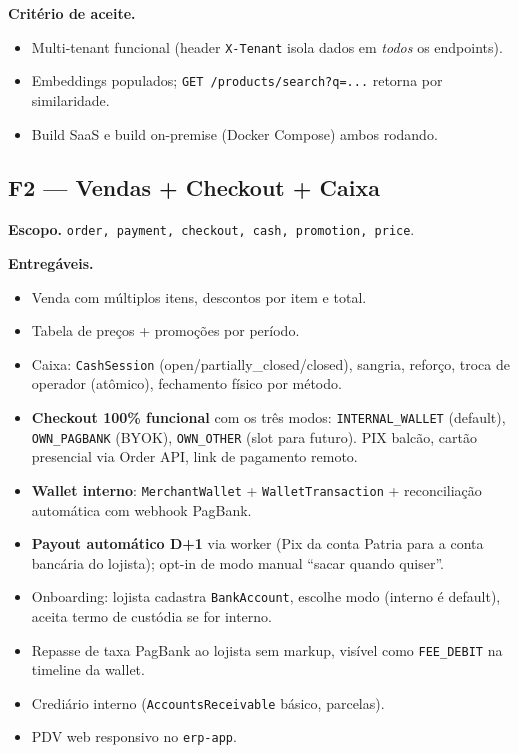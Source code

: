 \documentclass[11pt,a4paper]{article}
\begin{document}
\textbf{Critério de aceite.}
\begin{itemize}[leftmargin=2em]
  \item Multi-tenant funcional (header \texttt{X-Tenant} isola dados em
        \emph{todos} os endpoints).
  \item Embeddings populados; \texttt{GET /products/search?q=...} retorna
        por similaridade.
  \item Build SaaS e build on-premise (Docker Compose) ambos rodando.
\end{itemize}

\subsection{F2 --- Vendas + Checkout + Caixa}

\textbf{Escopo.} \texttt{order, payment, checkout, cash, promotion, price}.

\textbf{Entregáveis.}
\begin{itemize}[leftmargin=2em]
  \item Venda com múltiplos itens, descontos por item e total.
  \item Tabela de preços + promoções por período.
  \item Caixa: \texttt{CashSession} (open/partially\_closed/closed),
        sangria, reforço, troca de operador (atômico), fechamento físico
        por método.
  \item \textbf{Checkout 100\% funcional} com os três modos:
        \texttt{INTERNAL\_WALLET} (default), \texttt{OWN\_PAGBANK} (BYOK),
        \texttt{OWN\_OTHER} (slot para futuro). PIX balcão, cartão
        presencial via Order API, link de pagamento remoto.
  \item \textbf{Wallet interno}: \texttt{MerchantWallet} +
        \texttt{WalletTransaction} + reconciliação automática com webhook
        PagBank.
  \item \textbf{Payout automático D+1} via worker (Pix da conta Patria
        para a conta bancária do lojista); opt-in de modo manual ``sacar
        quando quiser''.
  \item Onboarding: lojista cadastra \texttt{BankAccount}, escolhe modo
        (interno é default), aceita termo de custódia se for interno.
  \item Repasse de taxa PagBank ao lojista sem markup, visível como
        \texttt{FEE\_DEBIT} na timeline da wallet.
  \item Crediário interno (\texttt{AccountsReceivable} básico, parcelas).
  \item PDV web responsivo no \texttt{erp-app}.
\end{itemize}
\end{document}
